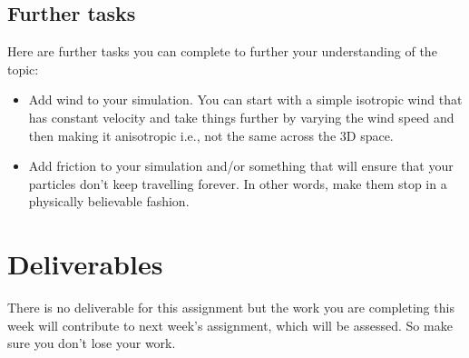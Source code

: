 \documentclass[12pt]{article}
\begin{document}
\subsection*{Further tasks}

Here are further tasks you can complete to further your understanding of the topic:

\begin{itemize}
\item Add wind to your simulation. You can start with a simple isotropic wind that has constant velocity and take things further by varying the wind speed and then making it anisotropic i.e., not the same across the 3D space.
\item Add friction to your simulation and/or something that will ensure that your particles don't keep travelling forever. In other words, make them stop in a physically believable fashion.
\end{itemize}

\section*{Deliverables}

There is no deliverable for this assignment but the work you are completing this week will contribute to next week's assignment, which will be assessed. So make sure you don't lose your work.
\end{document}
